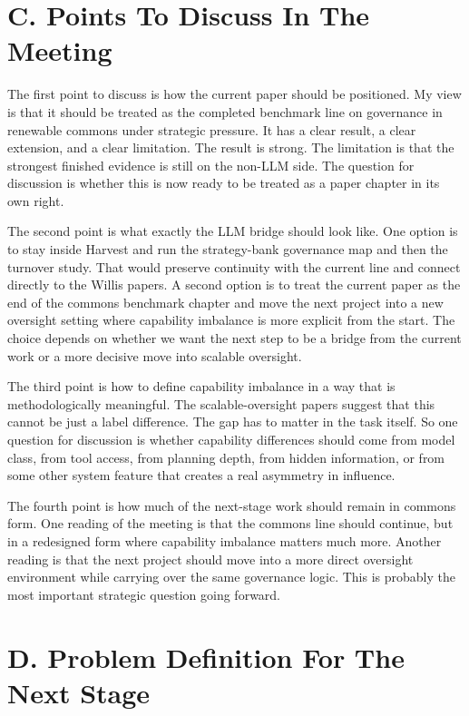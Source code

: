 \documentclass[11pt]{article}
\begin{document}
\section*{C. Points To Discuss In The Meeting}

The first point to discuss is how the current paper should be positioned. My view is that it should be treated as the completed benchmark line on governance in renewable commons under strategic pressure. It has a clear result, a clear extension, and a clear limitation. The result is strong. The limitation is that the strongest finished evidence is still on the non-LLM side. The question for discussion is whether this is now ready to be treated as a paper chapter in its own right.

The second point is what exactly the LLM bridge should look like. One option is to stay inside Harvest and run the strategy-bank governance map and then the turnover study. That would preserve continuity with the current line and connect directly to the Willis papers. A second option is to treat the current paper as the end of the commons benchmark chapter and move the next project into a new oversight setting where capability imbalance is more explicit from the start. The choice depends on whether we want the next step to be a bridge from the current work or a more decisive move into scalable oversight.

The third point is how to define capability imbalance in a way that is methodologically meaningful. The scalable-oversight papers suggest that this cannot be just a label difference. The gap has to matter in the task itself. So one question for discussion is whether capability differences should come from model class, from tool access, from planning depth, from hidden information, or from some other system feature that creates a real asymmetry in influence.

The fourth point is how much of the next-stage work should remain in commons form. One reading of the meeting is that the commons line should continue, but in a redesigned form where capability imbalance matters much more. Another reading is that the next project should move into a more direct oversight environment while carrying over the same governance logic. This is probably the most important strategic question going forward.

\section*{D. Problem Definition For The Next Stage}
\end{document}
